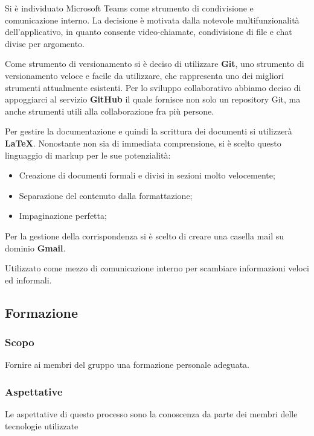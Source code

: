				Si è individuato Microsoft Teams come strumento di condivisione e comunicazione interno. La decisione è motivata dalla notevole multifunzionalità dell'applicativo, in quanto consente video-chiamate, condivisione di file e chat divise per argomento.
				
				Come strumento di versionamento si è deciso di utilizzare \textbf{Git}, uno strumento di versionamento veloce e facile da utilizzare, che rappresenta uno dei migliori strumenti attualmente esistenti. Per lo sviluppo collaborativo abbiamo deciso di appoggiarci al servizio \textbf{GitHub} il quale fornisce non solo un repository Git, ma anche strumenti utili alla collaborazione fra più persone.
				
			\subsubsubsection{\LaTeX{}}
				Per gestire la documentazione e quindi la scrittura dei documenti si utilizzerà \textbf{\LaTeX}. Nonostante non sia di immediata comprensione, si è scelto questo linguaggio di markup per le sue potenzialità:
				\begin{itemize}
					\item Creazione di documenti formali e divisi in sezioni molto velocemente;
					\item Separazione del contenuto dalla formattazione;
					\item Impaginazione perfetta;
				\end{itemize}
			
				Per la gestione della corrispondenza si è scelto di creare una casella mail su dominio \textbf{Gmail}.
				
				Utilizzato come mezzo di comunicazione interno per scambiare informazioni veloci ed informali.
				

	\subsection{Formazione}
	
		\subsubsection{Scopo}
		Fornire ai membri del gruppo una formazione personale adeguata.
		
		\subsubsection{Aspettative}
		Le aspettative di questo processo sono la conoscenza da parte dei membri delle tecnologie utilizzate
		

